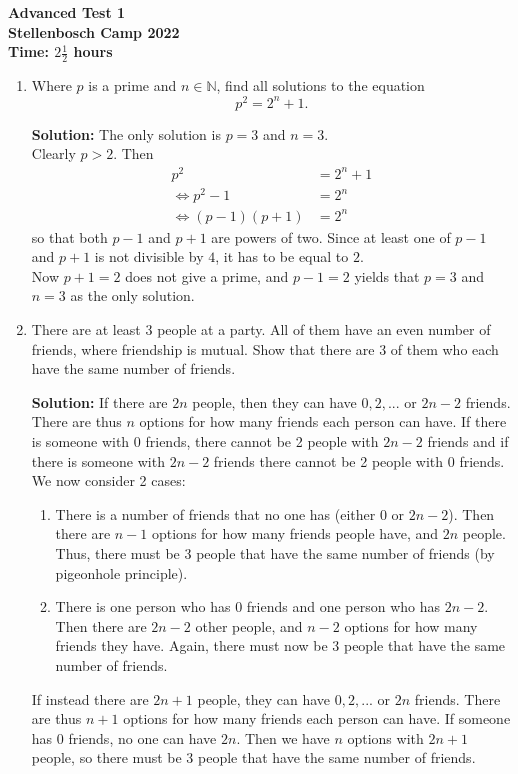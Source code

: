 \documentclass{article}
\begin{document}
\thispagestyle{empty}

\begin{center}
  \textbf{\Large Advanced Test 1}
  \\ \vspace{1em}
  \textbf{\large Stellenbosch Camp 2022}
  \\ \vspace{1em}
  \textbf{\large Time: $2\frac{1}{2}$ hours}
\end{center}

\bigskip

\begin{enumerate}[itemsep=\fill]
\item %
Where $p$ is a prime and $n\in\mathbb{N}$, find all solutions to the equation \[p^2 = 2^n + 1.\]

\textbf{Solution:} The only solution is $p = 3$ and $n = 3$.
\\ Clearly $p>2$. Then 
\begin{align*}
	p^2 &= 2^n + 1
	\\ \iff p^2-1 &= 2^n
	\\ \iff (p-1)(p+1) &= 2^n
\end{align*}
so that both $p-1$ and $p+1$ are powers of two. Since at least one of $p-1$ and $p+1$ is not divisible by $4$, it has to be equal to $2$.
\\ Now $p+1 = 2$ does not give a prime, and $p-1 = 2$ yields that $p =3$ and $n=3$ as the only solution. 
\item %
There are at least 3 people at a party. All of them have an even number of friends, where friendship is mutual. Show that there are 3 of them who each have the same number of friends.

\textbf{Solution:} If there are $2n$ people, then they can have $0,2,...$ or $2n-2$ friends. There are thus $n$ options for how many friends each person can have. If there is someone with 0 friends, there cannot be 2 people with $2n-2$ friends and if there is someone with $2n-2$ friends there cannot be 2 people with 0 friends. We now consider 2 cases:
\begin{enumerate}
\item There is a number of friends that no one has (either 0 or $2n-2$). Then there are $n-1$ options for how many friends people have, and $2n$ people. Thus, there must be 3 people that have the same number of friends (by pigeonhole principle).
\item There is one person who has 0 friends and one person who has $2n-2$. Then there are $2n-2$ other people, and $n-2$ options for how many friends they have. Again, there must now be 3 people that have the same number of friends.
\end{enumerate}
If instead there are $2n+1$ people, they can have $0,2,...$ or $2n$ friends. There are thus $n+1$ options for how many friends each person can have. If someone has 0 friends, no one can have $2n$. Then we have $n$ options with $2n+1$ people, so there must be 3 people that have the same number of friends.



\end{enumerate}
\end{document}
